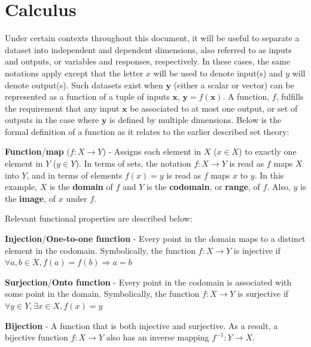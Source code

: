 \section{Calculus}

Under certain contexts throughout this document, it will be useful to separate a dataset into independent and dependent dimensions, also referred to as inputs and outputs, or variables and responses, respectively.
%
In these cases, the same notations apply except that the letter $x$ will be used to denote input(s) and $y$ will denote output(s).
%
Such datasets exist when $\mathbf{y}$ (either a scalar or vector) can be represented as a function of a tuple of inputs $\mathbf{x}$, $\mathbf{y}=f(\mathbf{x})$.
%
A function, $f$, fulfills the requirement that any input $\mathbf{x}$ be associated to at most one output, or set of outputs in the case where $\mathbf{y}$ is defined by multiple dimensions.
%
Below is the formal definition of a function as it relates to the earlier described set theory:

\begin{defn}
  \textbf{Function}/\textbf{map} ($f : X \rightarrow Y$) - Assigns each
  element in $X$ ($x \in X$) to exactly one element in $Y$ ($y \in Y$).
  In terms of sets, the notation $f : X \rightarrow Y$ is read as $f$
  maps $X$ into $Y$, and in terms of elements $f(x)=y$ is read as $f$ maps $x$
  to $y$.
  In this example, $X$ is the \textbf{domain} of $f$ and $Y$ is the
  \textbf{codomain}, or \textbf{range}, of $f$. Also, $y$ is the \textbf{image},
  of $x$ under $f$.
\end{defn}

Relevant functional properties are described below:

\begin{defn}
  \textbf{Injection}/\textbf{One-to-one function} - Every point in the domain
  maps to a distinct element in the codomain. Symbolically, the function
  $f:X\rightarrow Y$ is injective if $\forall a,b\in X,f(a)=f(b)\Rightarrow a=b$
\end{defn}

\begin{defn}
  \textbf{Surjection}/\textbf{Onto function} - Every point in the codomain is
  associated with some point in the domain. Symbolically, the function
  $f:X \rightarrow Y$ is surjective if $\forall y \in Y,\exists x \in X,f(x)=y$
\end{defn}

\begin{defn}
  \textbf{Bijection} - A function that is both injective and surjective. As a
  result, a bijective function $f: X \rightarrow Y$ also has an inverse mapping
  $f^{-1} : Y \rightarrow X$.
\end{defn}

